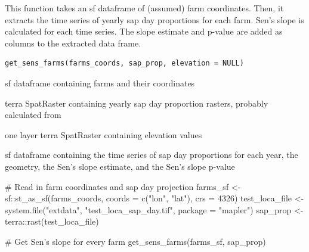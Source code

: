 %
\begin{Description}
This function takes an sf dataframe of (assumed) farm coordinates. Then, it
extracts the time series of yearly sap day proportions for each farm. Sen's
slope is calculated for each time series. The slope estimate and p-value are
added as columns to the extracted data frame.
\end{Description}
%
\begin{Usage}
\begin{verbatim}
get_sens_farms(farms_coords, sap_prop, elevation = NULL)
\end{verbatim}
\end{Usage}
%
\begin{Arguments}
\begin{ldescription}
\item[\code{farms\_coords}] sf dataframe containing farms and their coordinates

\item[\code{sap\_prop}] terra SpatRaster containing yearly sap day proportion
rasters, probably calculated from 

\item[\code{elevation}] one layer terra SpatRaster containing elevation values
\end{ldescription}
\end{Arguments}
%
\begin{Value}
sf dataframe containing the time series of sap day proportions
for each year, the geometry, the Sen's slope estimate, and the Sen's slope
p-value
\end{Value}
%
\begin{Examples}
\begin{ExampleCode}
# Read in farm coordinates and sap day projection
farms_sf <- sf::st_as_sf(farms_coords, coords = c("lon", "lat"), crs = 4326)
test_loca_file <- system.file("extdata", "test_loca_sap_day.tif",
                              package = "mapler")
sap_prop <- terra::rast(test_loca_file)

# Get Sen's slope for every farm
get_sens_farms(farms_sf, sap_prop)
\end{ExampleCode}
\end{Examples}
